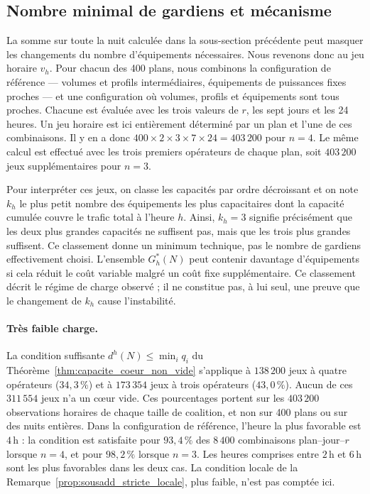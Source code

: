 \FloatBarrier

\subsection{Nombre minimal de gardiens et mécanisme}
\label{subsec:seuils_capacite_mecanisme}

La somme sur toute la nuit calculée dans la sous-section précédente peut
masquer les changements du nombre d'équipements nécessaires. Nous revenons
donc au jeu horaire \(v_h\). Pour chacun des 400 plans, nous combinons la
configuration de référence --- volumes et profils intermédiaires, équipements
de puissances fixes proches --- et une configuration où volumes, profils et
équipements sont tous proches. Chacune est évaluée avec les trois valeurs de
\(r\), les sept jours et les 24 heures. Un jeu horaire
est ici entièrement déterminé par un plan et l'une de ces combinaisons. Il y
en a donc
\(400\times2\times3\times7\times24=403\,200\) pour \(n=4\). Le même calcul est
effectué avec les trois premiers opérateurs de chaque plan, soit
\(403\,200\) jeux supplémentaires pour \(n=3\).

Pour interpréter ces jeux, on classe les capacités par ordre décroissant et
on note \(k_h\) le plus petit nombre des équipements les plus capacitaires
dont la capacité cumulée couvre le trafic total à l'heure \(h\). Ainsi,
\(k_h=3\) signifie précisément que les deux plus grandes capacités ne
suffisent pas, mais que les trois plus grandes suffisent. Ce classement
donne un minimum technique, pas le nombre de gardiens effectivement choisi.
L'ensemble \(G_h^*(N)\) peut contenir davantage d'équipements si cela réduit
le coût variable malgré un coût fixe supplémentaire. Ce classement décrit le
régime de charge observé ; il ne constitue pas, à lui seul, une preuve que le
changement de \(k_h\) cause l'instabilité.

\paragraph{Très faible charge.}
La condition suffisante
\(d^h(N)\leqslant\min_i q_i\) du
Théorème~\ref{thm:capacite_coeur_non_vide} s'applique à
\(138\,200\) jeux à quatre opérateurs (\(34{,}3\,\%\)) et à \(173\,354\) jeux à
trois opérateurs (\(43{,}0\,\%\)). Aucun de ces \(311\,554\) jeux n'a un cœur
vide. Ces pourcentages portent sur les \(403\,200\) observations horaires de
chaque taille de coalition, et non sur 400 plans ou sur des nuits entières.
Dans la configuration de
référence, l'heure la plus favorable est \(4\,\mathrm h\) : la condition est satisfaite
pour \(93{,}4\,\%\) des \(8\,400\) combinaisons plan--jour--\(r\) lorsque \(n=4\),
et pour \(98{,}2\,\%\) lorsque \(n=3\). Les heures comprises entre
\(2\,\mathrm h\) et \(6\,\mathrm h\) sont les plus
favorables dans les deux cas. La condition locale de la
Remarque~\ref{prop:sousadd_stricte_locale}, plus faible, n'est pas comptée ici.

